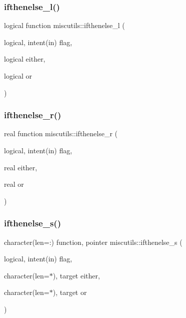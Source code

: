 \mbox{\label{namespacemiscutils_a87ca2142c2922c2060f891b5bd3da8bb}} 
\subsubsection{\texorpdfstring{ifthenelse\+\_\+l()}{ifthenelse\_l()}}
{\footnotesize\ttfamily logical function miscutils\+::ifthenelse\+\_\+l (\begin{DoxyParamCaption}\item[{logical, intent(in)}]{flag,  }\item[{logical}]{either,  }\item[{logical}]{or }\end{DoxyParamCaption})}

\mbox{\label{namespacemiscutils_aa5e8165f492c8bced78208b32802202b}} 
\subsubsection{\texorpdfstring{ifthenelse\+\_\+r()}{ifthenelse\_r()}}
{\footnotesize\ttfamily real function miscutils\+::ifthenelse\+\_\+r (\begin{DoxyParamCaption}\item[{logical, intent(in)}]{flag,  }\item[{real}]{either,  }\item[{real}]{or }\end{DoxyParamCaption})}

\mbox{\label{namespacemiscutils_a994af8094beca0770dd32924d0e7dbdb}} 
\subsubsection{\texorpdfstring{ifthenelse\+\_\+s()}{ifthenelse\_s()}}
{\footnotesize\ttfamily character(len=\+:) function, pointer miscutils\+::ifthenelse\+\_\+s (\begin{DoxyParamCaption}\item[{logical, intent(in)}]{flag,  }\item[{character(len=$\ast$), target}]{either,  }\item[{character(len=$\ast$), target}]{or }\end{DoxyParamCaption})}

